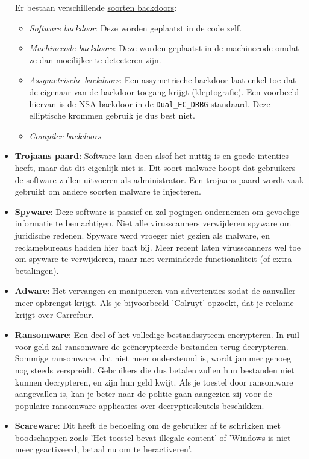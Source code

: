 \documentclass{report}
\begin{document}
\begin{itemize}
		Er bestaan verschillende \underline{soorten backdoors}: 
		\begin{itemize}
			\item \emph{Software backdoor}: Deze worden geplaatst in de code zelf.
			\item \emph{Machinecode backdoors}: Deze worden geplaatst in de machinecode omdat ze dan moeilijker te detecteren zijn.
			\item \emph{Assymetrische backdoors}: Een assymetrische backdoor laat enkel toe dat de eigenaar van de backdoor toegang krijgt (kleptografie). Een voorbeeld hiervan is de NSA backdoor in de \texttt{Dual\_EC\_DRBG} standaard. Deze elliptische krommen gebruik je dus best niet.
			\item \emph{Compiler backdoors}
		\end{itemize}
		\item \textbf{Trojaans paard}: Software kan doen alsof het nuttig is en goede intenties heeft, maar dat dit eigenlijk niet is. Dit soort malware hoopt dat gebruikers de software zullen uitvoeren als administrator. Een trojaans paard wordt vaak gebruikt om andere soorten malware te injecteren.
		\item \textbf{Spyware}: Deze software is passief en zal pogingen ondernemen om gevoelige informatie te bemachtigen. Niet alle virusscanners verwijderen spyware om juridische redenen. Spyware werd vroeger niet gezien als malware, en reclamebureaus hadden hier baat bij. Meer recent laten virusscanners wel toe om spyware te verwijderen, maar met verminderde functionaliteit (of extra betalingen).
		\item \textbf{Adware}: Het vervangen en manipueren van advertenties zodat de aanvaller meer opbrengst krijgt. Als je bijvoorbeeld 'Colruyt' opzoekt, dat je reclame krijgt over Carrefour. 
		\item \textbf{Ransomware}: Een deel of het volledige bestandssyteem encrypteren. In ruil voor geld zal ransomware de geëncrypteerde bestanden terug decrypteren. Sommige ransomware, dat niet meer ondersteund is, wordt jammer genoeg nog steeds verspreidt. Gebruikers die dus betalen zullen hun bestanden niet kunnen decrypteren, en zijn hun geld kwijt. Als je toestel door ransomware aangevallen is, kan je beter naar de politie gaan aangezien zij voor de populaire ransomware applicaties over decryptiesleutels beschikken.
		\item \textbf{Scareware}: Dit heeft de bedoeling om de gebruiker af te schrikken met boodschappen zoals 'Het toestel bevat illegale content' of 'Windows is niet meer geactiveerd, betaal nu om te heractiveren'.

\end{itemize}
\end{document}
